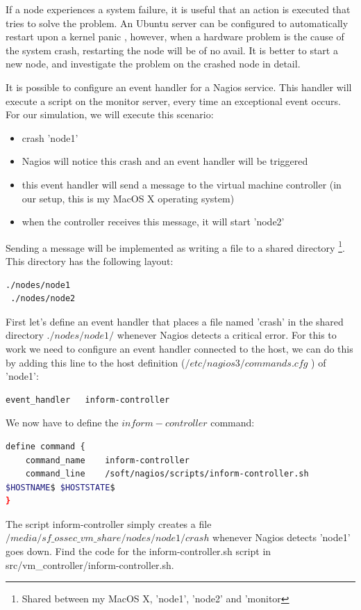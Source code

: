\documentclass[12pt]{report}
\begin{document}
If a node experiences a system failure, it is useful that an action is
executed that tries to solve the problem. An Ubuntu server can be
configured to automatically restart upon a kernel panic
\cite{restart_upon_kernel_panic}, however, when a hardware problem is
the cause of the system crash, restarting the node will be of no
avail. It is better to start a new node, and investigate the problem
on the crashed node in detail.

It is possible to configure an event handler for a Nagios
service. This handler will execute a script on the monitor
server, every time an exceptional event occurs.
For our simulation, we will execute this scenario:
\begin{itemize}
\item crash 'node1'
\item Nagios will notice this crash and an event handler will be
  triggered
\item this event handler will send a message to the virtual machine
  controller (in our setup, this is my MacOS X operating
  system)
\item when the controller receives this message, it will start 'node2'
\end{itemize}
Sending a message will be implemented as writing a file to a shared
directory \footnote{Shared between my MacOS X, 'node1', 'node2' and 'monitor}. This directory has the following layout:
\begin{lstlisting}[language=bash]
 ./nodes/node1
 ./nodes/node2
\end{lstlisting} 
First let's define an event handler that places a file named 'crash' in the
shared directory $./nodes/node1/$ whenever Nagios detects a critical
error.
For this to work we need to configure an event handler connected to
the host, we can do this by adding this line to the host definition ($/etc/nagios3/commands.cfg$ ) of 'node1':
\begin{lstlisting}[language=bash]
event_handler   inform-controller
\end{lstlisting} 
We now have to define the $inform-controller$ command:
\begin{lstlisting}[language=bash]
define command {
    command_name    inform-controller
    command_line    /soft/nagios/scripts/inform-controller.sh
$HOSTNAME$ $HOSTSTATE$
}
\end{lstlisting} 
The script inform-controller simply creates a file \\
$/media/sf\_ossec\_vm\_share/nodes/node1/crash$ whenever Nagios
detects 'node1' goes down.
Find the code for the inform-controller.sh script in \\
src/vm\_controller/inform-controller.sh.\\
\end{document}
